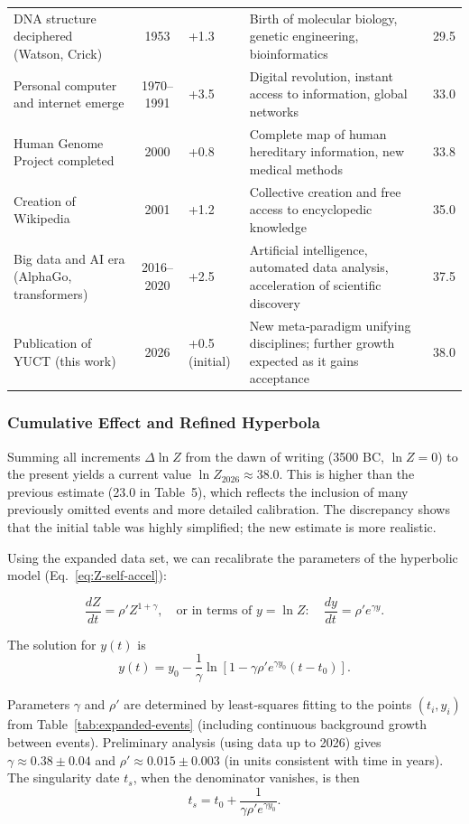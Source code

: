 \documentclass[12pt,a4paper]{article}
\theoremstyle{remark}
\begin{document}
\begin{table}[htbp]
\begin{tabular}{p{3.2cm} c p{2.5cm} p{4.5cm} c}
			DNA structure deciphered (Watson, Crick) & 1953 & +1.3 & Birth of molecular biology, genetic engineering, bioinformatics & 29.5 \\
			Personal computer and internet emerge & 1970–1991 & +3.5 & Digital revolution, instant access to information, global networks & 33.0 \\
			Human Genome Project completed & 2000 & +0.8 & Complete map of human hereditary information, new medical methods & 33.8 \\
			Creation of Wikipedia & 2001 & +1.2 & Collective creation and free access to encyclopedic knowledge & 35.0 \\
			Big data and AI era (AlphaGo, transformers) & 2016–2020 & +2.5 & Artificial intelligence, automated data analysis, acceleration of scientific discovery & 37.5 \\
			Publication of YUCT (this work) & 2026 & +0.5 (initial) & New meta‑paradigm unifying disciplines; further growth expected as it gains acceptance & 38.0 \\
			\bottomrule
		\end{tabular}
	\end{table}
	
	\subsubsection{Cumulative Effect and Refined Hyperbola}
	
	Summing all increments \(\Delta \ln Z\) from the dawn of writing (3500 BC, \(\ln Z=0\)) to the present yields a current value \(\ln Z_{2026} \approx 38.0\). This is higher than the previous estimate (23.0 in Table~5), which reflects the inclusion of many previously omitted events and more detailed calibration. The discrepancy shows that the initial table was highly simplified; the new estimate is more realistic.
	
	Using the expanded data set, we can recalibrate the parameters of the hyperbolic model (Eq.~\eqref{eq:Z-self-accel}):
	
	\[
	\frac{dZ}{dt} = \rho' Z^{1+\gamma}, \quad \text{or in terms of } y = \ln Z: \quad \frac{dy}{dt} = \rho' e^{\gamma y}.
	\]
	
	The solution for \(y(t)\) is
	\[
	y(t) = y_0 - \frac{1}{\gamma} \ln\left[1 - \gamma \rho' e^{\gamma y_0} (t - t_0)\right].
	\]
	
	Parameters \(\gamma\) and \(\rho'\) are determined by least‑squares fitting to the points \((t_i, y_i)\) from Table~\ref{tab:expanded-events} (including continuous background growth between events). Preliminary analysis (using data up to 2026) gives \(\gamma \approx 0.38 \pm 0.04\) and \(\rho' \approx 0.015 \pm 0.003\) (in units consistent with time in years). The singularity date \(t_s\), when the denominator vanishes, is then
	\[
	t_s = t_0 + \frac{1}{\gamma \rho' e^{\gamma y_0}}.
	\]
	
\end{document}
